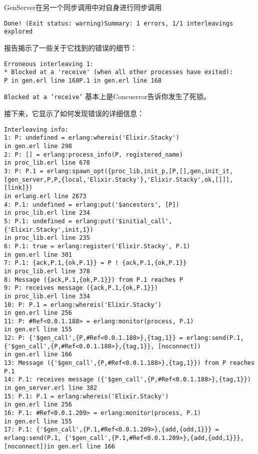 \begin{example}{GenServer在另一个同步调用中对自身进行同步调用}
\begin{code}{}
\begin{verbatim}
Done! (Exit status: warning)Summary: 1 errors, 1/1 interleavings explored
\end{verbatim}
\end{code}

报告揭示了一些关于它找到的错误的细节：

\begin{code}{}
\begin{verbatim}
Erroneous interleaving 1:
* Blocked at a 'receive' (when all other processes have exited):
P in gen.erl line 168P.1 in gen.erl line 168
\end{verbatim}
\end{code}

\texttt{Blocked at a 'receive'}
基本上是Concuerror告诉你发生了死锁。

接下来，它显示了如何发现错误的详细信息：

\begin{code}{}
\begin{verbatim}
Interleaving info:
1: P: undefined = erlang:whereis('Elixir.Stacky')
in gen.erl line 298
2: P: [] = erlang:process_info(P, registered_name)
in proc_lib.erl line 678
3: P: P.1 = erlang:spawn_opt({proc_lib,init_p,[P,[],gen,init_it,[gen_server,P,P,{local,'Elixir.Stacky'},'Elixir.Stacky',ok,[]]],[link]})
in erlang.erl line 2673
4: P.1: undefined = erlang:put('$ancestors', [P])
in proc_lib.erl line 234
5: P.1: undefined = erlang:put('$initial_call', {'Elixir.Stacky',init,1})
in proc_lib.erl line 235
6: P.1: true = erlang:register('Elixir.Stacky', P.1)
in gen.erl line 301
7: P.1: {ack,P.1,{ok,P.1}} = P ! {ack,P.1,{ok,P.1}}
in proc_lib.erl line 378
8: Message ({ack,P.1,{ok,P.1}}) from P.1 reaches P
9: P: receives message ({ack,P.1,{ok,P.1}})
in proc_lib.erl line 334
10: P: P.1 = erlang:whereis('Elixir.Stacky')
in gen.erl line 256
11: P: #Ref<0.0.1.188> = erlang:monitor(process, P.1)
in gen.erl line 155
12: P: {'$gen_call',{P,#Ref<0.0.1.188>},{tag,1}} = erlang:send(P.1, {'$gen_call',{P,#Ref<0.0.1.188>},{tag,1}}, [noconnect])
in gen.erl line 166
13: Message ({'$gen_call',{P,#Ref<0.0.1.188>},{tag,1}}) from P reaches P.1
14: P.1: receives message ({'$gen_call',{P,#Ref<0.0.1.188>},{tag,1}})
in gen_server.erl line 382
15: P.1: P.1 = erlang:whereis('Elixir.Stacky')
in gen.erl line 256
16: P.1: #Ref<0.0.1.209> = erlang:monitor(process, P.1)
in gen.erl line 155
17: P.1: {'$gen_call',{P.1,#Ref<0.0.1.209>},{add,{odd,1}}} = erlang:send(P.1, {'$gen_call',{P.1,#Ref<0.0.1.209>},{add,{odd,1}}}, [noconnect])in gen.erl line 166
\end{verbatim}
\end{code}


\end{example}
